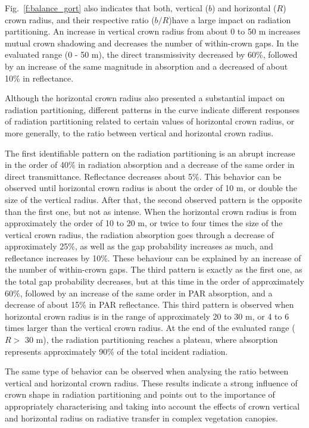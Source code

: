 \documentclass[a4paper,11pt]{report}
\begin{document}
Fig.~\ref{f:balance_gort} also indicates that both, vertical ($b$) and horizontal ($R$) crown radius, and their respective ratio ($b/R$)have a large impact on radiation partitioning. An increase in vertical crown radius from about 0 to 50 m increases mutual crown shadowing and decreases the number of within-crown gaps. In the evaluated range (0 - 50 m), the direct transmissivity decreased by 60\%, followed by an increase of the same magnitude in absorption and a decreased of about 10\% in reflectance. 

Although the horizontal crown radius also presented a substantial impact on radiation partitioning, different patterns in the curve indicate different responses of radiation partitioning related to certain values of horizontal crown radius, or more generally, to the ratio between vertical and horizontal crown radius. 

The first identifiable pattern on the radiation partitioning is an abrupt increase in the order of 40\% in radiation absorption and a decrease of the same order in direct transmittance. Reflectance decreases about 5\%. This behavior can be observed until horizontal crown radius is about the order of 10 m, or double the size of the vertical radius. After that, the second observed pattern is the opposite than the first one, but not as intense. When the horizontal crown radius is from approximately the order of 10 to 20 m, or twice to four times the size of the vertical crown radius, the radiation absorption goes through a decrease of approximately 25\%, as well as the gap probability increases as much, and reflectance increases by 10\%. These behaviour can be explained by an increase of the number of within-crown gaps. The third pattern is exactly as the first one, as the total gap probability decreases, but at this time in the order of approximately 60\%, followed by an increase of the same order in PAR absorption, and a decrease of about 15\% in PAR reflectance. This third pattern is observed when horizontal crown radius is in the range of approximately 20 to 30 m, or 4 to 6 times larger than the vertical crown radius. At the end of the evaluated range ($R >$ 30 m), the radiation partitioning reaches a plateau, where absorption represents approximately 90\% of the total incident radiation. 

The same type of behavior can be observed when analysing the ratio between vertical and horizontal crown radius. These results indicate a strong influence of crown shape in radiation partitioning and points out to the importance of appropriately characterising and taking into account the effects of crown vertical and horizontal radius on radiative transfer in complex vegetation canopies.
   
\end{document}
